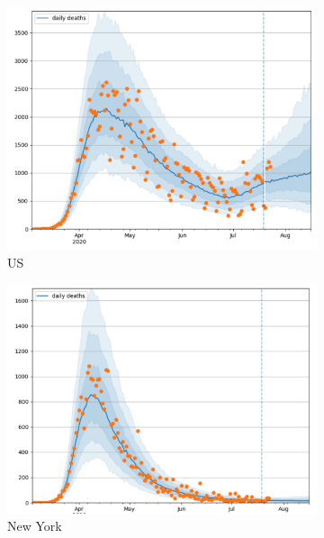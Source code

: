 \documentclass[11pt]{amsart}
\begin{document}
\begin{figure}
  \centering
     \begin{subfigure}{.5\textwidth}
  \centering
    \includegraphics[scale=.5]{US.png}
    \caption{US}
\end{subfigure}%
\begin{subfigure}{.5\textwidth}
  \centering
    \includegraphics[scale=.5]{NY.png}
    \caption{New York}
\end{subfigure}
\begin{subfigure}{.5\textwidth}
  \centering

\end{subfigure}
\end{figure}
\end{document}
